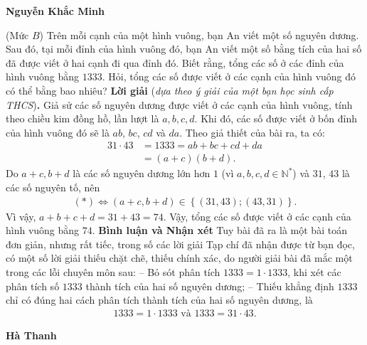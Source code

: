 \begin{multicols}{2}
	\begin{flushright}
		\textbf{\color{thachthuctoanhoc}Nguyễn Khắc Minh}
	\end{flushright}
	{\color{thachthuctoanhoc}{\usefont{T5}{qag}{b}{n} P721.}}
	(Mức $B$)
	Trên mỗi cạnh của một hình vuông, bạn An viết một số nguyên dương. Sau đó, tại mỗi đỉnh của hình vuông đó, bạn An viết một số bằng tích của hai số đã được viết ở hai cạnh đi qua đỉnh đó. Biết rằng, tổng các số ở các đỉnh của hình vuông bằng $1333$. Hỏi, tổng các số được viết ở các cạnh của hình vuông đó có thể bằng bao nhiêu?
	\vskip 0.05cm
	\textbf{\color{thachthuctoanhoc}Lời giải} (\textit{dựa theo ý giải của một bạn học sinh cấp THCS})\textbf{\color{thachthuctoanhoc}.}
	\vskip 0.05cm
	Giả sử các số nguyên dương được viết ở các cạnh của hình vuông, tính theo chiều kim đồng hồ, lần lượt là $a, b, c, d$.
	\vskip 0.05cm
	Khi đó, các số được viết ở bốn đỉnh của hình vuông đó sẽ là $ab$, $bc$, $cd$ và $da$.
	\vskip 0.05cm
	Theo giả thiết của bài ra, ta có:
	\begin{align*}
		31 \cdot 43 &= 1333 = ab + bc + cd + da \\
		&= \left( a + c \right)\left( b + d \right) . \tag{$*$}
	\end{align*}
	Do $a + c, b + d$ là các số nguyên dương lớn hơn $1$ (vì $a,b,c,d \in \mathbb{N^*}$) và $31$, $43$ là các số nguyên tố, nên
	\begin{align*}
		\left( *  \right) \Leftrightarrow \left( {a + c,b + d} \right) \in \left\{ {\left( {31,43} \right);\left( {43,31} \right)} \right\}.
	\end{align*}
	Vì vậy, $a + b + c + d = 31 + 43 = 74$.
	\vskip 0.05cm
	Vậy, tổng các số được viết ở các cạnh của hình vuông bằng $74$.
	\vskip 0.05cm
	\textbf{\color{thachthuctoanhoc}Bình luận và Nhận xét}
	\vskip 0.05cm	
	Tuy bài đã ra là một bài toán đơn giản, nhưng rất tiếc, trong số các lời giải Tạp chí đã nhận được từ bạn đọc, có một số lời giải thiếu chặt chẽ, thiếu chính xác, do người giải bài đã mắc một trong các lỗi chuyên môn sau:
	\vskip 0.05cm
	-- Bỏ sót phân tích $1333 = 1 \cdot 1333$, khi xét các phân tích số $1333$ thành tích của hai số nguyên dương;
	\vskip 0.05cm
	-- Thiếu khẳng định $1333$ chỉ có đúng hai cách phân tích thành tích của hai số nguyên dương, là
	\begin{align*}
		1333 = 1 \cdot 1333 \text{ và } 1333 = 31 \cdot 43.
	\end{align*}  
	\begin{flushright}
		\textbf{\color{thachthuctoanhoc}Hà Thanh}
	\end{flushright}

\end{multicols}

